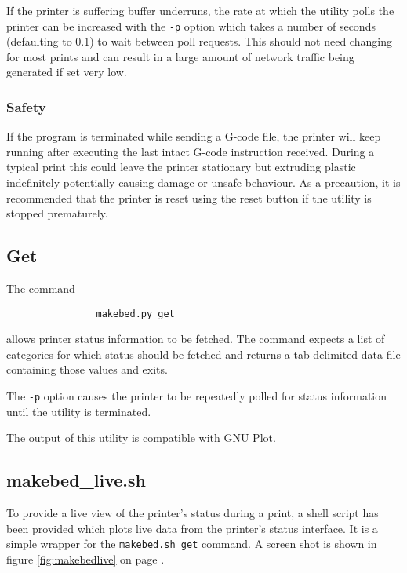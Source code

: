 			If the printer is suffering buffer underruns, the rate at which the
			utility polls the printer can be increased with the \verb|-p| option which
			takes a number of seconds (defaulting to 0.1) to wait between poll
			requests. This should not need changing for most prints and can result in
			a large amount of network traffic being generated if set very low.
			
			\subsubsection{Safety}
				
				If the program is terminated while sending a G-code file, the printer
				will keep running after executing the last intact G-code instruction
				received. During a typical print this could leave the printer stationary
				but extruding plastic indefinitely potentially causing damage or unsafe
				behaviour. As a precaution, it is recommended that the printer is reset
				using the reset button if the utility is stopped prematurely.
		
		\subsection{Get}
			
			The command
			\begin{verbatim}
				makebed.py get
			\end{verbatim}
			allows printer status information to be fetched. The command expects a
			list of categories for which status should be fetched and returns a
			tab-delimited data file containing those values and exits.
			
			The \verb|-p| option causes the printer to be repeatedly polled for status
			information until the utility is terminated.
			
			The output of this utility is compatible with GNU Plot.
		
		\subsection{makebed\_live.sh}
			
			\label{sec:makebedliveDoc}
			
			To provide a live view of the printer's status during a print, a shell
			script has been provided which plots live data from the printer's status
			interface. It is a simple wrapper for the \verb|makebed.sh get| command. A
			screen shot is shown in figure \ref{fig:makebedlive} on page
			\pageref{fig:makebedlive}.

